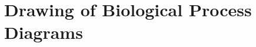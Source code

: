 \documentclass[
	fontsize=10pt, %
	twoside=true, %
	secnumdepth=1, %
  toc=indentunnumbered %
]{kaobook}
\begin{document}



\section{Drawing of Biological Process Diagrams}%
\label{sec:draw-biol-netw}
\end{document}
